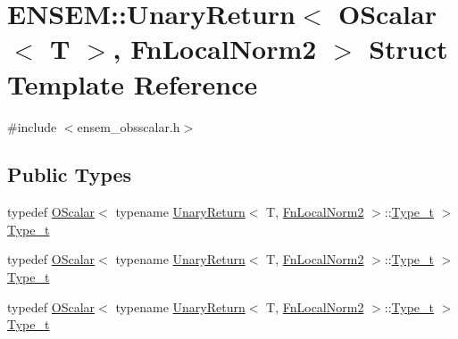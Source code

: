 \hypertarget{structENSEM_1_1UnaryReturn_3_01OScalar_3_01T_01_4_00_01FnLocalNorm2_01_4}{}\section{E\+N\+S\+EM\+:\+:Unary\+Return$<$ O\+Scalar$<$ T $>$, Fn\+Local\+Norm2 $>$ Struct Template Reference}
\label{structENSEM_1_1UnaryReturn_3_01OScalar_3_01T_01_4_00_01FnLocalNorm2_01_4}


{\ttfamily \#include $<$ensem\+\_\+obsscalar.\+h$>$}

\subsection*{Public Types}
\begin{DoxyCompactItemize}
\item 
typedef \mbox{\hyperlink{classENSEM_1_1OScalar}{O\+Scalar}}$<$ typename \mbox{\hyperlink{structENSEM_1_1UnaryReturn}{Unary\+Return}}$<$ T, \mbox{\hyperlink{structENSEM_1_1FnLocalNorm2}{Fn\+Local\+Norm2}} $>$\+::\mbox{\hyperlink{structENSEM_1_1UnaryReturn_3_01OScalar_3_01T_01_4_00_01FnLocalNorm2_01_4_a610bc1debf55f6071875791495bca2a5}{Type\+\_\+t}} $>$ \mbox{\hyperlink{structENSEM_1_1UnaryReturn_3_01OScalar_3_01T_01_4_00_01FnLocalNorm2_01_4_a610bc1debf55f6071875791495bca2a5}{Type\+\_\+t}}
\item 
typedef \mbox{\hyperlink{classENSEM_1_1OScalar}{O\+Scalar}}$<$ typename \mbox{\hyperlink{structENSEM_1_1UnaryReturn}{Unary\+Return}}$<$ T, \mbox{\hyperlink{structENSEM_1_1FnLocalNorm2}{Fn\+Local\+Norm2}} $>$\+::\mbox{\hyperlink{structENSEM_1_1UnaryReturn_3_01OScalar_3_01T_01_4_00_01FnLocalNorm2_01_4_a610bc1debf55f6071875791495bca2a5}{Type\+\_\+t}} $>$ \mbox{\hyperlink{structENSEM_1_1UnaryReturn_3_01OScalar_3_01T_01_4_00_01FnLocalNorm2_01_4_a610bc1debf55f6071875791495bca2a5}{Type\+\_\+t}}
\item 
typedef \mbox{\hyperlink{classENSEM_1_1OScalar}{O\+Scalar}}$<$ typename \mbox{\hyperlink{structENSEM_1_1UnaryReturn}{Unary\+Return}}$<$ T, \mbox{\hyperlink{structENSEM_1_1FnLocalNorm2}{Fn\+Local\+Norm2}} $>$\+::\mbox{\hyperlink{structENSEM_1_1UnaryReturn_3_01OScalar_3_01T_01_4_00_01FnLocalNorm2_01_4_a610bc1debf55f6071875791495bca2a5}{Type\+\_\+t}} $>$ \mbox{\hyperlink{structENSEM_1_1UnaryReturn_3_01OScalar_3_01T_01_4_00_01FnLocalNorm2_01_4_a610bc1debf55f6071875791495bca2a5}{Type\+\_\+t}}
\end{DoxyCompactItemize}


